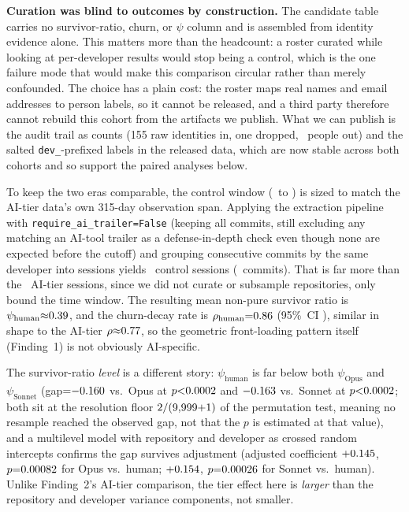 \textbf{Curation was blind to outcomes by construction.} The candidate table carries no survivor-ratio, churn, or $\psi$ column and is assembled from identity evidence alone. This matters more than the headcount: a roster curated while looking at per-developer results would stop being a control, which is the one failure mode that would make this comparison circular rather than merely confounded. The choice has a plain cost: the roster maps real names and email addresses to person labels, so it cannot be released, and a third party therefore cannot rebuild this cohort from the artifacts we publish. What we can publish is the audit trail as counts (155 raw identities in, one dropped, \statPCCtrlDevelopers\ people out) and the salted \texttt{dev\_}-prefixed labels in the released data, which are now stable across both cohorts and so support the paired analyses below.

To keep the two eras comparable, the control window (\statPCCtrlSince\ to \statPCCtrlUntil) is sized to match the AI-tier data's own 315-day observation span. Applying the extraction pipeline with \texttt{require\_ai\_trailer=False} (keeping all commits, still excluding any matching an AI-tool trailer as a defense-in-depth check even though none are expected before the cutoff) and grouping consecutive commits by the same developer into sessions yields \statPCCtrlSessions\ control sessions (\statPCCtrlCommits\ commits). That is far more than the \statPCSessions\ AI-tier sessions, since we did not curate or subsample repositories, only bound the time window. The resulting mean non-pure survivor ratio is $\psi_{\mathrm{human}}{\approx}0.39$, and the churn-decay rate is $\rho_{\mathrm{human}}{=}0.86$ (95\%~CI \statPCCtrlRhoCI), similar in shape to the AI-tier $\rho{\approx}0.77$, so the geometric front-loading pattern itself (Finding~1) is not obviously AI-specific.

The survivor-ratio \emph{level} is a different story: $\psi_{\mathrm{human}}$ is far below both $\psi_{\mathrm{Opus}}$ and $\psi_{\mathrm{Sonnet}}$ (gap${=}{-}0.160$ vs.\ Opus at $p{<}0.0002$ and ${-}0.163$ vs.\ Sonnet at $p{<}0.0002$; both sit at the resolution floor $2/(9{,}999{+}1)$ of the permutation test, meaning no resample reached the observed gap, not that the $p$ is estimated at that value), and a multilevel model with repository and developer as crossed random intercepts confirms the gap survives adjustment (adjusted coefficient ${+}0.145$, $p{=}0.00082$ for Opus vs.\ human; ${+}0.154$, $p{=}0.00026$ for Sonnet vs.\ human). Unlike Finding~2's AI-tier comparison, the tier effect here is \emph{larger} than the repository and developer variance components, not smaller.

